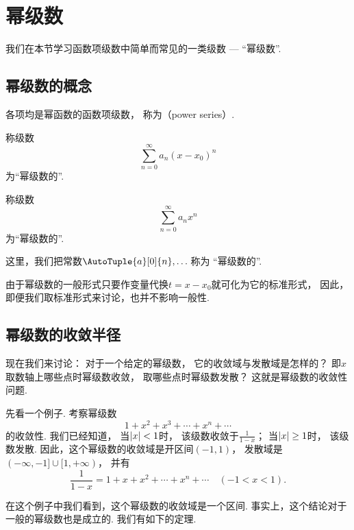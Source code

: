 \section{幂级数}
我们在本节学习函数项级数中简单而常见的一类级数 --- “幂级数”.

\subsection{幂级数的概念}
\begin{definition}\label{definition:无穷级数.幂级数}
各项均是幂函数的函数项级数，
称为（power series）.

称级数\[
	\sum_{n=0}^\infty a_n (x-x_0)^n
\]为“幂级数的”.

称级数\[
	\sum_{n=0}^\infty a_n x^n
\]为“幂级数的”.

这里，我们把常数\(\AutoTuple{a}[0]{n},\dotsc\)称为
“幂级数的”.
\end{definition}

由于幂级数的一般形式只要作变量代换\(t = x - x_0\)就可化为它的标准形式，
因此，即便我们取标准形式来讨论，也并不影响一般性.

\subsection{幂级数的收敛半径}
现在我们来讨论：
对于一个给定的幂级数，
它的收敛域与发散域是怎样的？
即\(x\)取数轴上哪些点时幂级数收敛，
取哪些点时幂级数发散？
这就是幂级数的收敛性问题.

先看一个例子.
考察幂级数\[
	1+x^2+x^3+\dotsb+x^n+\dotsb
\]的收敛性.
我们已经知道，
当\(\abs{x}<1\)时，
该级数收敛于\(\frac{1}{1-x}\)；
当\(\abs{x}\geq1\)时，
该级数发散.
因此，这个幂级数的收敛域是开区间\((-1,1)\)，
发散域是\((-\infty,-1]\cup[1,+\infty)\)，
并有\[
	\frac{1}{1-x} = 1+x+x^2+\dotsb+x^n+\dotsb
	\quad(-1<x<1).
\]

在这个例子中我们看到，这个幂级数的收敛域是一个区间.
事实上，这个结论对于一般的幂级数也是成立的.
我们有如下的定理.

